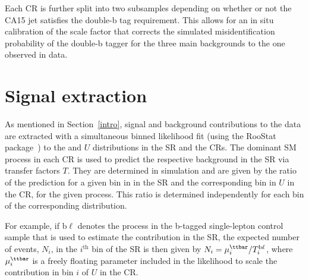 
Each CR is further split into two subsamples depending on whether or not the CA15 jet satisfies the double-b tag requirement. This allows for an in situ calibration of the scale factor that corrects the simulated misidentification probability of the double-b tagger for the three main backgrounds to the one observed in data. 

\section{Signal extraction}

As mentioned in Section~\ref{intro}, signal and background contributions to the data are extracted with a simultaneous binned likelihood fit (using the {\sc RooStat} package~\cite{roostats}) to the \MET and $U$ distributions in the SR and the CRs.
%
The dominant SM process in each CR is used to predict the respective background in the SR via transfer factors $T$. They are determined in simulation and are given by the ratio of the prediction for a given bin in \ptmiss in the SR and the corresponding bin in $U$ in the CR, for the given process. This ratio is determined independently for each bin of the corresponding distribution.
  
For example, if b$\ell$ denotes the \ttbar process in the b-tagged single-lepton control sample that is used to estimate the \ttbar contribution in the SR, the expected number of \ttbar events, $N_{i}$, in the $i^\text{th}$ bin of the SR is then given by $N_{i}= \mu^{\ttbar}_{i}/T^{\mathrm{b}\ell}_{i}$, where  $\mu^{\ttbar}_i$ is a freely floating parameter included in the likelihood to scale the \ttbar contribution in bin $i$ of $U$ in the CR.

